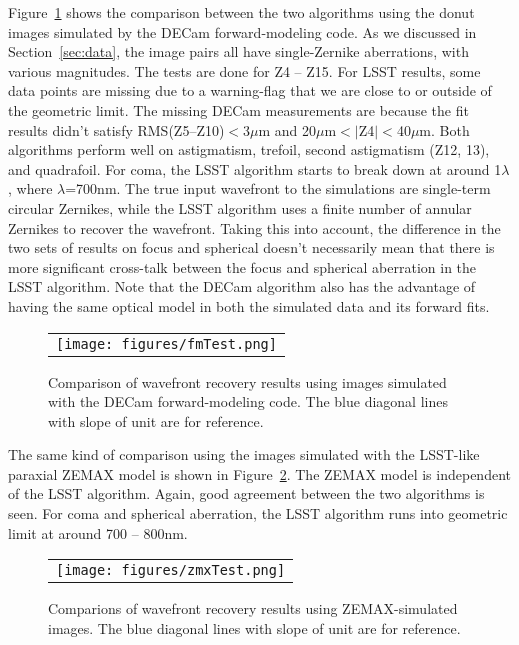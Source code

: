\documentclass[]{spie}  %
\begin{document}
Figure~\ref{fig:fmTest} shows the comparison between the two algorithms using the donut images simulated by the DECam forward-modeling code.
As we discussed in Section~\ref{sec:data}, the image pairs all have single-Zernike aberrations, with various magnitudes. The tests are done for Z4 -- Z15.
For LSST results, some data points are missing due to a warning-flag that we are close to or outside of the geometric limit.
The missing DECam measurements are because the fit results didn't satisfy RMS(Z5--Z10)$<$3$\mu$m and 
20$\mu$m$<|$Z4$|<$40$\mu$m.
Both algorithms perform well on astigmatism, trefoil, second astigmatism (Z12, 13), and quadrafoil.
For coma, the LSST algorithm starts to break down at around 1$\lambda$, where $\lambda$=700nm.
The true input wavefront to the simulations are single-term circular Zernikes,
while the LSST algorithm uses a finite number of annular Zernikes to recover the wavefront.
Taking this into account, the difference in the two sets of results on focus and spherical
doesn't necessarily mean that there is more significant cross-talk between the focus and spherical aberration in the LSST algorithm. 
Note that the DECam algorithm also has the advantage of having the same optical model in both the simulated data and its forward fits.

   \begin{figure} [tbph]
   \begin{center}
   \begin{tabular}{c} %
   \texttt{[image: figures/fmTest.png]}
   \end{tabular}
   \end{center}
   \caption[example] 
   { \label{fig:fmTest} 
Comparison of wavefront recovery results using images simulated with the DECam forward-modeling code.
The blue diagonal lines with slope of unit are for reference.
}
   \end{figure} 
		  
The same kind of comparison using the images simulated with the LSST-like paraxial ZEMAX model is shown in Figure~\ref{fig:zmxTest}. The ZEMAX model is independent of the LSST algorithm.
Again, good agreement between the two algorithms is seen.
For coma and spherical aberration, the LSST algorithm runs into geometric limit at around %
700 -- 800nm.

   \begin{figure} [tbph]
   \begin{center}
   \begin{tabular}{c} %
   \texttt{[image: figures/zmxTest.png]}
   \end{tabular}
   \end{center}
   \caption[example] 
   { \label{fig:zmxTest} 
Comparions of wavefront recovery results using ZEMAX-simulated images.
The blue diagonal lines with slope of unit are for reference.
}
   \end{figure} 
\end{document}
